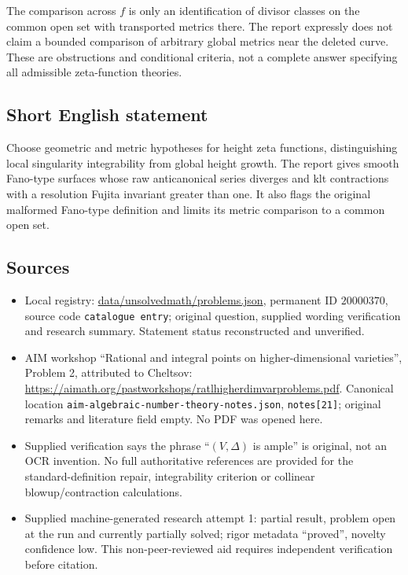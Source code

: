 \documentclass[11pt]{article}
\begin{document}
The comparison across $f$ is only an identification of divisor classes on the common open set with transported metrics there. The report expressly does not claim a bounded comparison of arbitrary global metrics near the deleted curve. These are obstructions and conditional criteria, not a complete answer specifying all admissible zeta-function theories.
\subsection{Short English statement}
Choose geometric and metric hypotheses for height zeta functions, distinguishing local singularity integrability from global height growth. The report gives smooth Fano-type surfaces whose raw anticanonical series diverges and klt contractions with a resolution Fujita invariant greater than one. It also flags the original malformed Fano-type definition and limits its metric comparison to a common open set.
\subsection{Sources}
\begin{itemize}
\item Local registry: \url{data/unsolvedmath/problems.json}, permanent ID $20000370$, source code \texttt{catalogue entry}; original question, supplied wording verification and research summary. Statement status reconstructed and unverified.
\item AIM workshop ``Rational and integral points on higher-dimensional varieties'', Problem 2, attributed to Cheltsov: \url{https://aimath.org/pastworkshops/ratlhigherdimvarproblems.pdf}. Canonical location \texttt{aim-algebraic-number-theory-notes.json}, \texttt{notes[21]}; original remarks and literature field empty. No PDF was opened here.
\item Supplied verification says the phrase ``$(V,\Delta)$ is ample'' is original, not an OCR invention. No full authoritative references are provided for the standard-definition repair, integrability criterion or collinear blowup/contraction calculations.
\item Supplied machine-generated research attempt 1: partial result, problem open at the run and currently partially solved; rigor metadata ``proved'', novelty confidence low. This non-peer-reviewed aid requires independent verification before citation.
\end{itemize}
\end{document}
